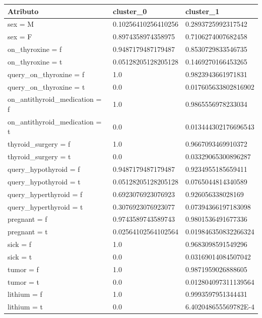 \documentclass[osajnl,twocolumn,showpacs,superscriptaddress,10pt,floatfix]{revtex4-1} %
\begin{document}
\begin{table}[ht]
    \centering
    \begin{tabular}{lll}

        Atributo & cluster\_0 & cluster\_1 \\
        \hline
        
        sex = M & 0.10256410256410256 & 0.2893725992317542 \\
        sex = F & 0.8974358974358975 & 0.7106274007682458 \\
        on\_thyroxine = f & 0.9487179487179487 & 0.8530729833546735 \\
        on\_thyroxine = t & 0.05128205128205128 & 0.1469270166453265 \\
        query\_on\_thyroxine = f & 1.0 & 0.9823943661971831 \\
        query\_on\_thyroxine = t & 0.0 & 0.017605633802816902 \\
        on\_antithyroid\_medication = f & 1.0 & 0.9865556978233034 \\
        on\_antithyroid\_medication = t & 0.0 & 0.013444302176696543 \\
        thyroid\_surgery = f & 1.0 & 0.9667093469910372 \\
        thyroid\_surgery = t & 0.0 & 0.03329065300896287 \\
        query\_hypothyroid = f & 0.9487179487179487 & 0.9234955185659411 \\
        query\_hypothyroid = t & 0.05128205128205128 & 0.0765044814340589 \\
        query\_hyperthyroid = f & 0.6923076923076923 & 0.926056338028169 \\
        query\_hyperthyroid = t & 0.3076923076923077 & 0.07394366197183098 \\
        pregnant = f & 0.9743589743589743 & 0.9801536491677336 \\
        pregnant = t & 0.02564102564102564 & 0.019846350832266324 \\
        sick = f & 1.0 & 0.9683098591549296 \\
        sick = t & 0.0 & 0.03169014084507042 \\
        tumor = f & 1.0 & 0.9871959026888605 \\
        tumor = t & 0.0 & 0.012804097311139564 \\
        lithium = f & 1.0 & 0.9993597951344431 \\
        lithium = t & 0.0 & 6.402048655569782E-4 \\

\end{tabular}
\end{table}
\end{document}
